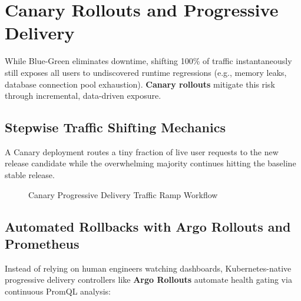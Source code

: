 \section{Canary Rollouts and Progressive Delivery}

While Blue-Green eliminates downtime, shifting 100\% of traffic instantaneously still exposes all users to undiscovered runtime regressions (e.g., memory leaks, database connection pool exhaustion). \textbf{Canary rollouts} mitigate this risk through incremental, data-driven exposure.

\subsection{Stepwise Traffic Shifting Mechanics}
A Canary deployment routes a tiny fraction of live user requests to the new release candidate while the overwhelming majority continues hitting the baseline stable release.

\begin{figure}[htbp]
\centering
{}
\caption{Canary Progressive Delivery Traffic Ramp Workflow}
\label{fig:canary-ramp}
\end{figure}

\subsection{Automated Rollbacks with Argo Rollouts and Prometheus}
Instead of relying on human engineers watching dashboards, Kubernetes-native progressive delivery controllers like \textbf{Argo Rollouts} automate health gating via continuous PromQL analysis:

